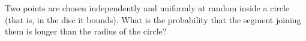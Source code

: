 Two points are chosen independently and uniformly at random inside a circle (that is, in the disc it bounds). What is the probability that the segment joining them is longer than the radius of the circle?
